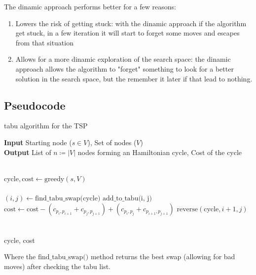 The dinamic approach performs better for a few reasons:

\begin{enumerate}
    \item Lowers the risk of getting stuck: with the dinamic approach if the algorithm get stuck, in a few iteration it will start to forget some moves and escapes from that situation
    \item Allows for a more dinamic exploration of the search space: the dinamic approach allows the algorithm to "forget" something to look for a better solution in the search space, but the remember it later if that lead to nothing.
\end{enumerate}

\subsection{Pseudocode}

\begin{algorithm}
    \caption{tabu algorithm for the TSP}
    \hspace*{\algorithmicindent} \textbf{Input} Starting node ($s\in V$), Set of nodes ($V$)\\
    \hspace*{\algorithmicindent} \textbf{Output} List of $n\coloneq|V|$ nodes forming an Hamiltonian cycle, Cost of the cycle
    \begin{algorithmic}\\
        
        \State $\mbox{cycle}, \mbox{cost} \gets \mbox{greedy}(s, V)$\\

        \\
            \State $(i, j)\gets \mbox{find\_tabu\_swap(cycle)}$
            \State $\mbox{add\_to\_tabu(i, j)}$
            \State $\mbox{cost}\gets\mbox{cost}-(c_{p_i,p_{i+1}}+c_{p_j,p_{j+1}})+(c_{p_i,p_{j}}+c_{p_{i+1},p_{j+1}})$
            \State $\mbox{reverse}(\mbox{cycle}, i+1, j)$\\

        \EndWhile\\\\

        \Return cycle, cost
    \end{algorithmic}
\end{algorithm}

Where the $\mbox{find\_tabu\_swap()}$ method returns the best swap (allowing for bad moves) after checking the tabu list.

